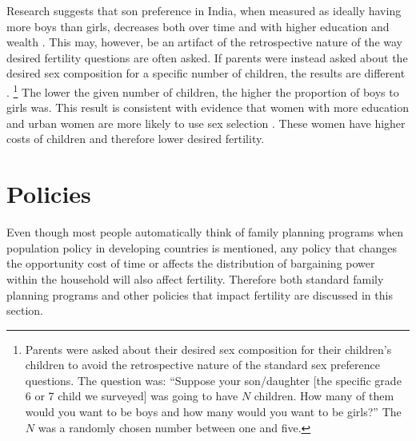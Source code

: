 \documentclass[letterpaper,12pt]{article}
\begin{document}
Research suggests that son preference in India, when measured as ideally
having more boys than girls, decreases both over time and with higher
education and wealth \citep{bhat03,pande07,Gaudin2011}. 
This may, however, be an artifact of the retrospective nature of the way
desired fertility questions are often asked. 
If parents were instead asked about the desired sex composition for a
specific number of children, the results are different
\citep{Jayachandran2017}.%
\footnote{
Parents were asked about their desired sex composition for their
children's children to avoid the retrospective nature of the standard
sex preference questions. 
The question was: ``Suppose your son/daughter [the specific grade 6 or
7 child we surveyed]
was going to have $N$ children. 
How many of them would you want to be boys and how many would you want
to be girls?'' The $N$ was a randomly chosen number between one and
five.} 
The lower the given number of children, the higher the proportion of
boys to girls was. 
This result is consistent with evidence that women with more education
and urban women are more likely to use sex selection
\citep{Portner2015b}. 
These women have higher costs of children and therefore lower desired
fertility.

\section{Policies}\label{policies}

Even though most people automatically think of family planning programs
when population policy in developing countries is mentioned, any policy
that changes the opportunity cost of time or affects the distribution of
bargaining power within the household will also affect fertility. 
Therefore both standard family planning programs and other policies that
impact fertility are discussed in this section.
\end{document}
